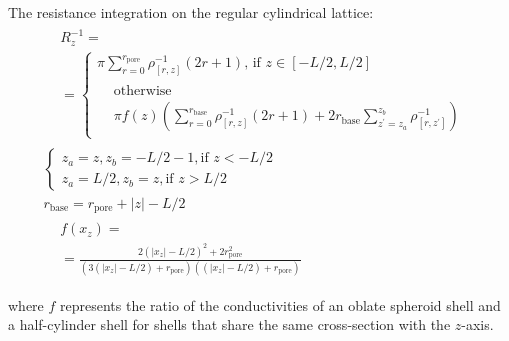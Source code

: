 \documentclass[10pt, a4paper]{article}
\begin{document}
\begin{multicols}{2}
The resistance integration on the regular cylindrical lattice:
\begin{gather}
    \label{eq:r_z_num}
    \begin{aligned} 
        &R_z^{-1} =
        \\
        &=\begin{cases}
             \pi \sum_{r=0}^{r_{\textrm{pore}}} \rho^{-1}_{[r,z]} (2r+1) \textrm{, if } z\in[-L/2,L/2]
             \\[4pt]
             \begin{aligned}
                &\textrm{otherwise}
                \\
                &\pi f(z) \left(\sum_{r=0}^{r_{\textrm{base}}} \rho^{-1}_{[r,z]} (2r+1) + 2 r_{\textrm{base}} \sum_{z^{\prime} = z_{a}}^{z_{b}}\rho^{-1}_{[r,z^{\prime}]}\right)
             \end{aligned}
        \end{cases}
    \end{aligned}
    \\
    \begin{cases}
        z_{a} = z, z_{b} = -L/2-1, \textrm{if } z < -L/2
        \\
        z_{a} = L/2, z_{b} = z, \textrm{if } z > L/2
    \end{cases}
    \\
    \label{eq:r_base}
    r_{\textrm{base}} = r_{\textrm{pore}} + |z| - L/2
    \\
    \label{eq:prefactor}
    \begin{aligned}
        &f(x_z) =\\
        & = \frac{2(|x_z|-L/2)^2 + 2r_{\textrm{pore}}^2}{(3(|x_z|-L/2)+r_{\textrm{pore}})((|x_z|-L/2)+r_{\textrm{pore}})}
    \end{aligned}
\end{gather}

where $f$ represents the ratio of the conductivities of an oblate spheroid shell and a half-cylinder shell for shells that share the same cross-section with the $z$-axis.


\end{multicols}
\end{document}
